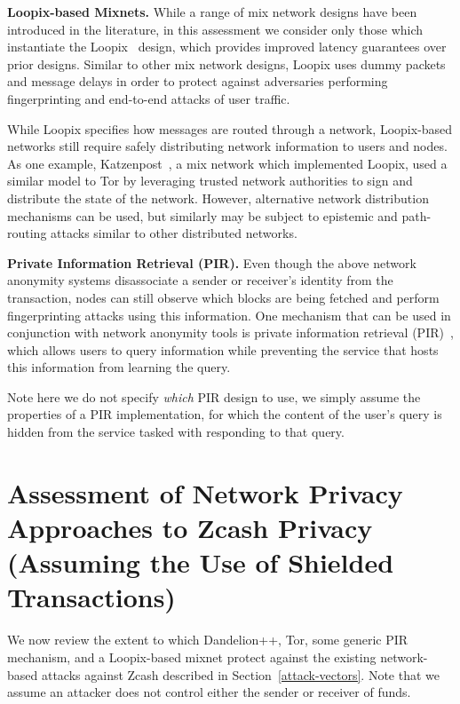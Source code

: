 \documentclass{article}
\begin{document}
\textbf{Loopix-based Mixnets.}
While a range of mix network designs have been introduced in the literature, in
this assessment we consider only those which instantiate the
Loopix~\cite{Piotrowska:2017:LAS} design, which provides improved latency
guarantees over prior designs. Similar to other mix network designs, Loopix
uses dummy packets and message delays in order to protect against adversaries
performing fingerprinting and end-to-end attacks of user traffic.

While Loopix specifies how messages are routed through a network, Loopix-based
networks still require safely distributing network information to users and
nodes. As one example, Katzenpost~\cite{katzenpost}, a mix network which implemented
Loopix,  used a similar model to Tor
by leveraging trusted network authorities to sign and distribute the state of
the network. However, alternative network distribution mechanisms can be used,
but similarly may be subject to epistemic and path-routing attacks similar to
other distributed networks.

\textbf{Private Information Retrieval (PIR).}
Even though the above network anonymity systems disassociate a sender or
receiver's identity from the transaction, nodes can still observe which blocks
are being fetched and perform fingerprinting attacks using this information.
One mechanism that can be used in conjunction with network anonymity tools is
private information retrieval (PIR)~\cite{pir}, which allows users to query information
while preventing the service that hosts this information from learning the
query.

Note here we do not specify \emph{which} PIR design to use, we simply assume
the properties of a PIR implementation, for which the content of the user's
query is hidden from the service tasked with responding to that query.


\section{Assessment of Network Privacy Approaches to Zcash Privacy (Assuming
the Use of Shielded Transactions)}
\label{network-privacy-assessment}

We now review the extent to which Dandelion++, Tor, some generic PIR mechanism,
and a Loopix-based mixnet
protect against the existing network-based attacks against Zcash described in
Section~\ref{attack-vectors}.
Note that we assume an attacker does not control either the sender or receiver
of funds.
\end{document}
